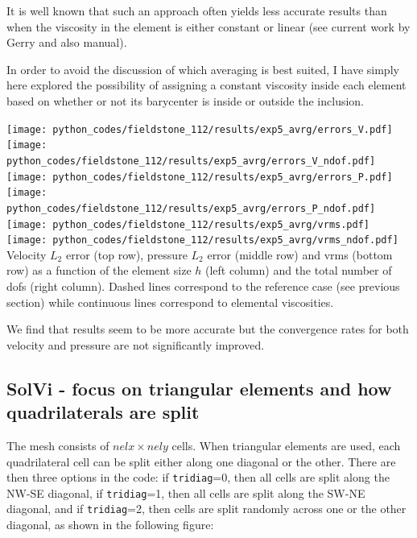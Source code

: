 It is well known that such an approach often yields less accurate results
than when the viscosity in the element is either constant or linear (see 
current work by Gerry and also \aspect manual).

In order to avoid the discussion of which averaging is best suited, 
I have simply here explored the possibility of assigning a constant 
viscosity inside each element based on whether or not its barycenter is 
inside or outside the inclusion.

\begin{center}
\texttt{[image: python\_codes/fieldstone\_112/results/exp5\_avrg/errors\_V.pdf]}
\texttt{[image: python\_codes/fieldstone\_112/results/exp5\_avrg/errors\_V\_ndof.pdf]}\\
\texttt{[image: python\_codes/fieldstone\_112/results/exp5\_avrg/errors\_P.pdf]}
\texttt{[image: python\_codes/fieldstone\_112/results/exp5\_avrg/errors\_P\_ndof.pdf]}\\
\texttt{[image: python\_codes/fieldstone\_112/results/exp5\_avrg/vrms.pdf]}
\texttt{[image: python\_codes/fieldstone\_112/results/exp5\_avrg/vrms\_ndof.pdf]}\\
{\captionfont Velocity $L_2$ error (top row), pressure $L_2$ error (middle row) and vrms (bottom row) 
as a function of the element size $h$ (left column) and the total number of dofs (right column).
Dashed lines correspond to the reference case (see previous section) while continuous lines
correspond to elemental viscosities. }
\end{center}
 
We find that results seem to be more accurate but the convergence rates for both 
velocity and pressure are not significantly improved.


\newpage
\subsection*{SolVi - focus on triangular elements and how quadrilaterals are split}
The mesh consists of $nelx \times nely$ cells. When triangular elements are used, 
each quadrilateral cell can be split either along one diagonal or the other. 
There are then three options in the code: if {\tt tridiag}=0, then all cells are split 
along the NW-SE diagonal, if {\tt tridiag}=1, then all cells are split
along the SW-NE diagonal, and if {\tt tridiag}=2, then cells are split 
randomly across one or the other diagonal, as shown in the following figure:

